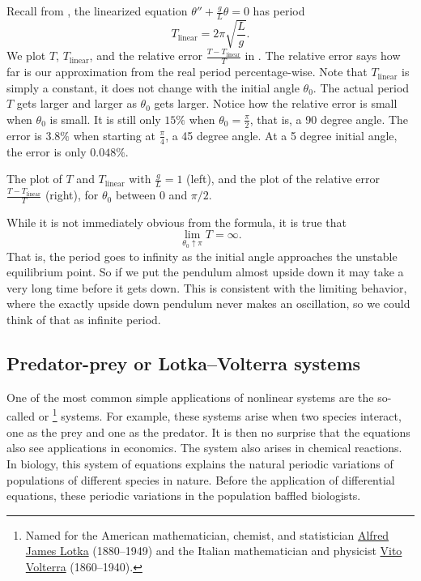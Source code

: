 Recall from , the linearized equation $\theta''+\frac{g}{L}\theta
= 0$ has period
\begin{equation*}
T_{\text{linear}} = 2\pi \sqrt{\frac{L}{g}} .
\end{equation*}
We plot $T$, $T_{\text{linear}}$, and the relative error
$\frac{T-T_{\text{linear}}}{T}$ in .  The relative error
says how far is our approximation from the real period percentage-wise.
Note that $T_{\text{linear}}$ is simply a constant, it does not change with
the initial angle $\theta_0$.  The actual period $T$ gets larger and larger as
$\theta_0$ gets larger.
Notice how the relative error is small when $\theta_0$ is small.  It is
still only $15\%$ when $\theta_0 = \frac{\pi}{2}$, that is, a 90 degree
angle.  The error is $3.8\%$ when starting at $\frac{\pi}{4}$, 
a 45 degree angle.  At a 5 degree initial angle, the error is only $0.048 \%$.

\begin{myfig}
\capstart
\caption{The plot of $T$ and $T_{\text{linear}}$ with $\frac{g}{L} =
1$ (left), and the plot of the relative
error $\frac{T-T_{\text{linear}}}{T}$ (right), for $\theta_0$ between 0 and $\pi/2$. \label{fig:TvsT0}}
\end{myfig}

While it is not immediately obvious from the formula, it is true that
\begin{equation*}
\lim_{\theta_0 \uparrow \pi} T = \infty .
\end{equation*}
That is, the period goes to infinity as the initial angle approaches the
unstable equilibrium point.  So if we put the pendulum almost upside down it
may take a very long time before it gets down.  This is consistent with the
limiting behavior, where the exactly upside down pendulum never makes an
oscillation, so we could think of that as infinite period.

\subsection{Predator-prey or Lotka--Volterra systems}

One of the most common simple applications of nonlinear systems are the
so-called \emph{} or
\emph{}%
\footnote{Named for the American mathematician, chemist, and statistician
\href{https://en.wikipedia.org/wiki/Alfred_J._Lotka}{Alfred James Lotka}
(1880--1949) and the Italian mathematician and physicist
\href{https://en.wikipedia.org/wiki/Vito_Volterra}{Vito Volterra}
(1860--1940).}
systems.  For example, these systems arise 
when two species interact, one as the prey and one as the predator.  It is
then no surprise that the equations also see applications in economics.
The system also arises in chemical reactions.
In biology, this system of equations explains the natural periodic variations of populations of
different species in nature.  Before the application of differential
equations, these periodic variations in the population baffled biologists.

